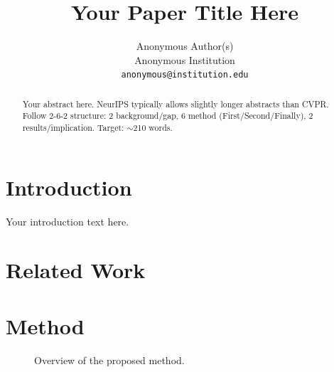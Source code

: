 \documentclass{article}
\title{Your Paper Title Here}
\author{
  Anonymous Author(s) \\
  Anonymous Institution \\
  \texttt{anonymous@institution.edu}
}
\begin{document}
\maketitle

\begin{abstract}
  Your abstract here. NeurIPS typically allows slightly longer abstracts than CVPR.
  Follow 2-6-2 structure: 2 background/gap, 6 method (First/Second/Finally),
  2 results/implication. Target: $\sim$210 words.
\end{abstract}

\section{Introduction}


Your introduction text here.

\section{Related Work}

\section{Method}


\begin{figure}[t]
  \centering
  \caption{Overview of the proposed method.}
  \label{fig:architecture}
\end{figure}
\end{document}
